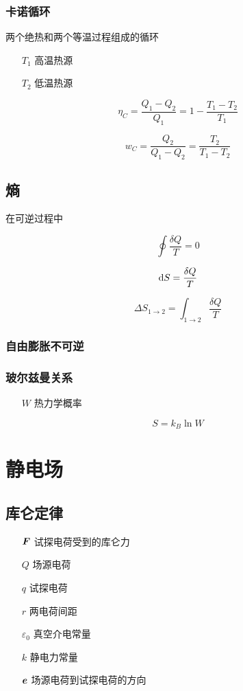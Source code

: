 \documentclass{article}
\begin{document}
\subsubsection{卡诺循环}

两个绝热和两个等温过程组成的循环

\begin{enumerate}
    \item[$T_1$] 高温热源
    \item[$T_2$] 低温热源
\end{enumerate}

\[\eta_C=\frac{Q_1-Q_2}{Q_1}=1-\frac{T_1-T_2}{T_1}\]

\[w_C=\frac{Q_2}{Q_1-Q_2}=\frac{T_2}{T_1-T_2}\]

\subsection{熵}

在可逆过程中

\[\oint\frac{\delta Q}T=0\]

\[\mathrm d S=\frac{\delta Q}T\]

\[\Delta S_{1\to2}=\int_{1\to2}\frac{\delta Q}T\]

\subsubsection{自由膨胀不可逆}

\subsubsection{玻尔兹曼关系}

\begin{enumerate}
    \item[$W$] 热力学概率
\end{enumerate}

\[S=k_B\ln W\]

\section{静电场}

\subsection{库仑定律}

\begin{enumerate}
    \item[$\boldsymbol{F}$] 试探电荷受到的库仑力
    \item[$Q$] 场源电荷
    \item[$q$] 试探电荷
    \item[$r$] 两电荷间距
    \item[$\varepsilon_0$] 真空介电常量
    \item[$k$] 静电力常量
    \item[$\boldsymbol{e}$] 场源电荷到试探电荷的方向
\end{enumerate}
\end{document}
